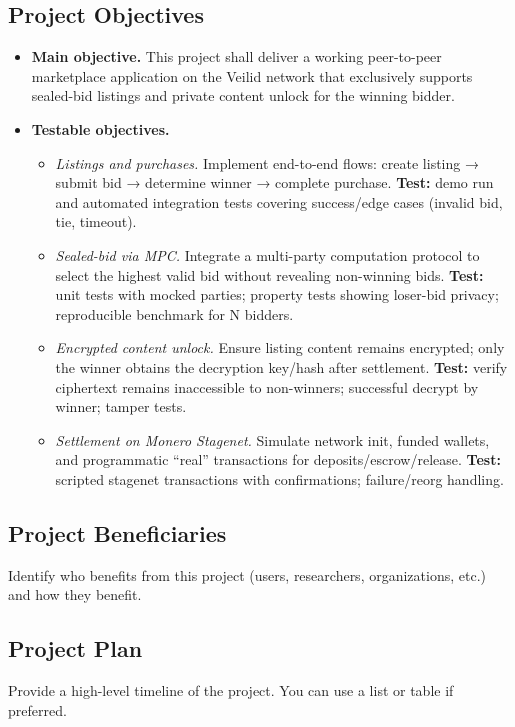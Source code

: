 \documentclass[12pt,a4paper]{article}
\begin{document}
\subsection{Project Objectives}
\begin{itemize}[noitemsep]
  \item \textbf{Main objective.} This project shall deliver a working peer-to-peer marketplace application on the Veilid network that exclusively supports sealed-bid listings and private content unlock for the winning bidder.

  \item \textbf{Testable objectives.}
    \begin{itemize}[noitemsep]
      \item \emph{Listings and purchases.} Implement end-to-end flows: create listing → submit bid → determine winner → complete purchase. \textbf{Test:} demo run and automated integration tests covering success/edge cases (invalid bid, tie, timeout).
      \item \emph{Sealed-bid via MPC.} Integrate a multi-party computation protocol to select the highest valid bid without revealing non-winning bids. \textbf{Test:} unit tests with mocked parties; property tests showing loser-bid privacy; reproducible benchmark for N bidders.
      \item \emph{Encrypted content unlock.} Ensure listing content remains encrypted; only the winner obtains the decryption key/hash after settlement. \textbf{Test:} verify ciphertext remains inaccessible to non-winners; successful decrypt by winner; tamper tests.
      \item \emph{Settlement on Monero Stagenet.} Simulate network init, funded wallets, and programmatic “real” transactions for deposits/escrow/release. \textbf{Test:} scripted stagenet transactions with confirmations; failure/reorg handling.
    \end{itemize}
\end{itemize}



\subsection{Project Beneficiaries}
Identify who benefits from this project (users, researchers, organizations, etc.) and how they benefit.

\subsection{Project Plan}
Provide a high-level timeline of the project. You can use a list or table if preferred.
\end{document}
